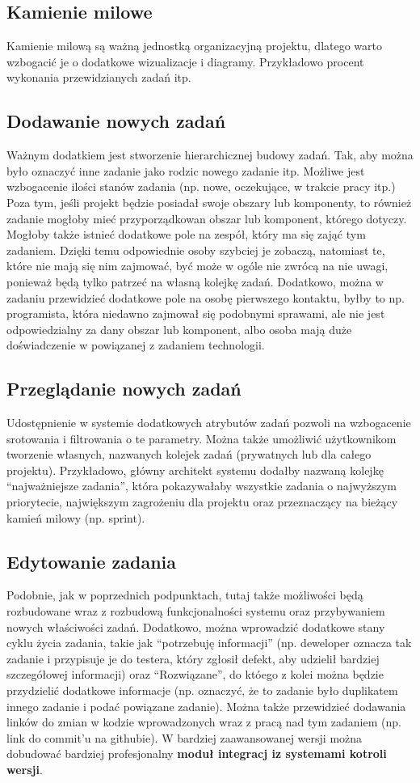 \documentclass[a4paper,12pt,notitlepage]{mwrep}
\begin{document}
\subsection{Kamienie milowe}
Kamienie milową są ważną jednostką organizacyjną projektu, dlatego warto wzbogacić je o dodatkowe
wizualizacje i diagramy. Przykładowo procent wykonania przewidzianych zadań itp.


\subsection{Dodawanie nowych zadań}
Ważnym dodatkiem jest stworzenie hierarchicznej budowy zadań.
Tak, aby można było oznaczyć inne zadanie jako rodzic nowego zadanie itp. Możliwe jest
wzbogacenie ilości stanów zadania (np. nowe, oczekujące, w trakcie pracy itp.) Poza tym,
jeśli projekt będzie posiadał swoje obszary lub komponenty, to również zadanie mogłoby mieć
przyporządkowan obszar lub komponent, którego dotyczy. Mogłoby także istnieć dodatkowe pole
na zespół, który ma się zająć tym zadaniem. Dzięki temu odpowiednie osoby szybciej je zobaczą,
natomiast te, które nie mają się nim zajmować, być może w ogóle nie zwrócą na nie uwagi,
ponieważ będą tylko patrzeć na własną kolejkę zadań. Dodatkowo, można w zadaniu przewidzieć
dodatkowe pole na osobę pierwszego kontaktu, byłby to np. programista, która niedawno zajmował
się podobnymi sprawami, ale nie jest odpowiedzialny za dany obszar lub komponent, albo osoba mają
duże doświadczenie w powiązanej z zadaniem technologii.


\subsection{Przeglądanie nowych zadań}
Udostępnienie w systemie dodatkowych atrybutów zadań pozwoli na wzbogacenie srotowania i filtrowania
o te parametry. Można także umożliwić użytkownikom tworzenie własnych, nazwanych kolejek zadań
(prywatnych lub dla całego projektu). Przykładowo, główny architekt systemu dodałby nazwaną kolejkę
“najważniejsze zadania”, która pokazywałaby wszystkie zadania o najwyższym priorytecie, największym
zagrożeniu dla projektu oraz przeznaczący na bieżący kamień milowy (np. sprint).


\subsection{Edytowanie zadania}
Podobnie, jak w poprzednich podpunktach, tutaj także możliwości będą rozbudowane wraz z rozbudową
funkcjonalności systemu oraz przybywaniem nowych właściwości zadań. Dodatkowo, można wprowadzić dodatkowe
stany cyklu życia zadania, takie jak “potrzebuję informacji” (np. deweloper oznacza tak zadanie
i przypisuje je do testera, który zgłosił defekt, aby udzielił bardziej szczegółowej informacji)
oraz “Rozwiązane”, do któego z kolei można będzie przydzielić dodatkowe informacje (np. oznaczyć,
że to zadanie było duplikatem innego zadanie i podać powiązane zadanie). Można także przewidzieć
dodawania linków do zmian w kodzie wprowadzonych wraz z pracą nad tym zadaniem (np. link do commit’u
na githubie). W bardziej zaawansowanej wersji można dobudować bardziej profesjonalny \textbf{moduł integracj
iz systemami kotroli wersji}.
\end{document}
